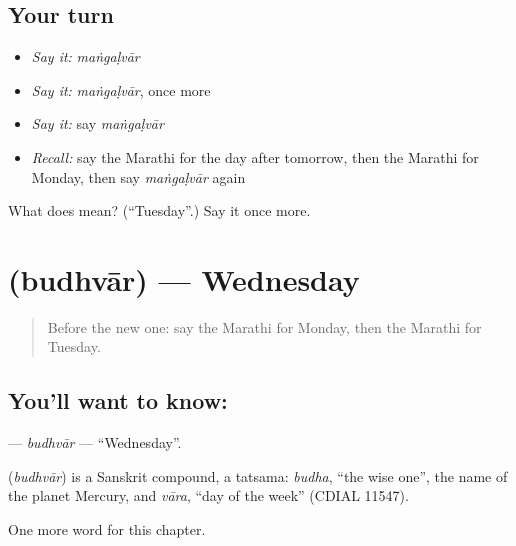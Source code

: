 \subsection*{Your turn}
\begin{itemize}
\raggedright
  \item \emph{Say it:} \emph{maṅgaḷvār}
  \item \emph{Say it:} \emph{maṅgaḷvār}, once more
  \item \emph{Say it:} say \emph{maṅgaḷvār}
  \item \emph{Recall:} say the Marathi for the day after tomorrow, then the Marathi for Monday, then say \emph{maṅgaḷvār} again
\end{itemize}

\begin{tcolorbox}[breakable,colback=teal!4,colframe=teal!35!black,title={Before you move on}]
What does  mean? (\textquotedblleft{}Tuesday\textquotedblright{}.) Say it once more.
\end{tcolorbox}
\section[\texorpdfstring{\mr{बुधवार} (budhvār)}{बुधवार (budhvār)}]{ (budhvār) — Wednesday}

\label{lesson:MR-C125-budhvar}



\begin{quote}
Before the new one: say the Marathi for Monday, then the Marathi for Tuesday.
\end{quote}

\subsection*{You'll want to know: }
\textbf{} — \emph{budhvār} — \textquotedblleft{}Wednesday\textquotedblright{}.

\begin{cousinweb}
\textbf{} (\emph{budhvār}) is a Sanskrit compound, a tatsama: \emph{budha}, \textquotedblleft{}the wise one\textquotedblright{}, the name of the planet Mercury, and \emph{vāra}, \textquotedblleft{}day of the week\textquotedblright{} (CDIAL 11547).
\end{cousinweb}

\begin{grammarlens}[title={What you've built}]
One more word for this chapter.
\end{grammarlens}

